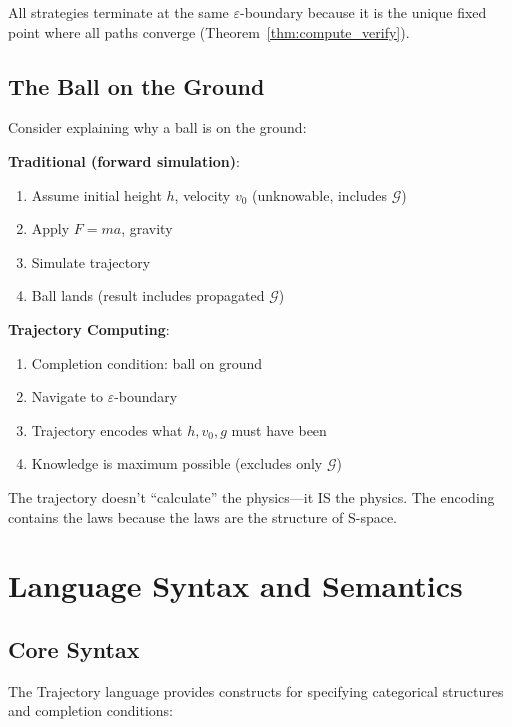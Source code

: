 \documentclass[twocolumn,10pt]{article}
\theoremstyle{remark}
\newcommand{\eps}{\varepsilon}
\newcommand{\Gres}{\mathcal{G}}
\begin{document}
All strategies terminate at the same $\eps$-boundary because it is the unique fixed point where all paths converge (Theorem~\ref{thm:compute_verify}).

\subsection{The Ball on the Ground}

Consider explaining why a ball is on the ground:

\textbf{Traditional (forward simulation)}:
\begin{enumerate}
    \item Assume initial height $h$, velocity $v_0$ (unknowable, includes $\Gres$)
    \item Apply $F = ma$, gravity
    \item Simulate trajectory
    \item Ball lands (result includes propagated $\Gres$)
\end{enumerate}

\textbf{Trajectory Computing}:
\begin{enumerate}
    \item Completion condition: ball on ground
    \item Navigate to $\eps$-boundary
    \item Trajectory encodes what $h, v_0, g$ must have been
    \item Knowledge is maximum possible (excludes only $\Gres$)
\end{enumerate}

The trajectory doesn't ``calculate'' the physics---it IS the physics. The encoding contains the laws because the laws are the structure of S-space.

\section{Language Syntax and Semantics}
\label{sec:language}

\subsection{Core Syntax}

The Trajectory language provides constructs for specifying categorical structures and completion conditions:
\end{document}
